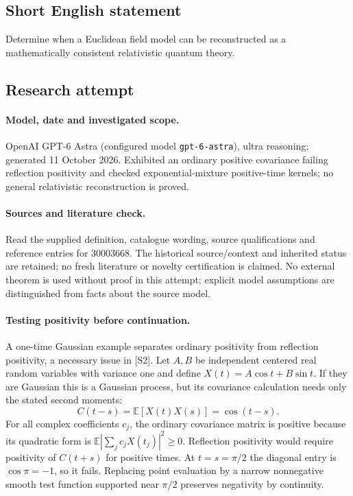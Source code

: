\documentclass[11pt]{article}
\begin{document}
\subsection{Short English statement}
Determine when a Euclidean field model can be reconstructed as a mathematically consistent relativistic quantum theory.
\subsection{Research attempt}
\paragraph{Model, date and investigated scope.}
OpenAI GPT-6 Astra (configured model \texttt{gpt-6-astra}), ultra reasoning; generated 11 October 2026. Exhibited an ordinary positive covariance failing reflection positivity and checked exponential-mixture positive-time kernels; no general relativistic reconstruction is proved.

\paragraph{Sources and literature check.}
Read the supplied definition, catalogue wording, source qualifications and reference entries for 30003668. The historical source/context and inherited status are retained; no fresh literature or novelty certification is claimed. No external theorem is used without proof in this attempt; explicit model assumptions are distinguished from facts about the source model.

\paragraph{Testing positivity before continuation.} A one-time Gaussian example separates ordinary positivity from reflection positivity, a necessary issue in [S2]. Let \(A,B\) be independent centered real random variables with variance one and define \(X(t)=A\cos t+B\sin t\). If they are Gaussian this is a Gaussian process, but its covariance calculation needs only the stated second moments:
\[
 C(t-s)=\mathbb E[X(t)X(s)]=\cos(t-s).
\]
For all complex coefficients \(c_j\), the ordinary covariance matrix is positive because its quadratic form is \(\mathbb E|\sum_jc_jX(t_j)|^2\ge0\). Reflection positivity would require positivity of \(C(t+s)\) for positive times. At \(t=s=\pi/2\) the diagonal entry is \(\cos\pi=-1\), so it fails. Replacing point evaluation by a narrow nonnegative smooth test function supported near \(\pi/2\) preserves negativity by continuity.
\end{document}
